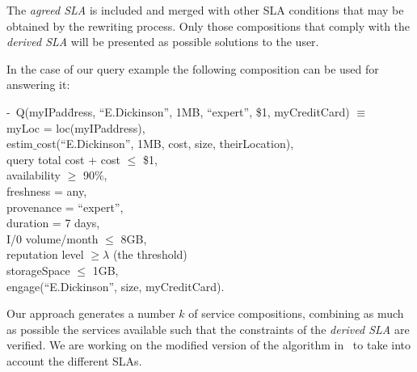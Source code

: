 The {\em agreed SLA} is included and merged with other SLA conditions that may be obtained by the rewriting process. Only those compositions that comply with the {\em derived SLA} will be presented as possible solutions to the user.
 

In the case of our query example the following composition can be used for answering it:

\begin{footnotesize}
\sf
\begin{tabbing}
 -~Q(myIPad\=dress, ``E.Dickinson'', 1MB, ``expert'', \$1, myCreditCard) $\equiv$ \\
 \>  myLoc = loc(myIPaddress), \\
 \>  estim$\_$cost(``E.Dickinson'', 1MB, cost, size, theirLocation), \\
 \>  query total cost + cost $\leq$ \$1,\\
 \>  availability $\geq$ 90$\%$, \\
 \>  freshness = any, \\
 \>  provenance = ``expert'', \\
 \>  duration = 7 days, \\
 \>  I/0 volume/month $\leq$ 8GB, \\
 \>  reputation level $\geq \lambda$ (the threshold) \\
 \>  storageSpace $\leq$ 1GB, \\
 \>  engage(``E.Dickinson'', size, myCreditCard).
 \end{tabbing} 
\end{footnotesize}

Our approach  generates a number $k$ of service compositions, combining as much as possible the services available such that the constraints of the {\em derived SLA} are verified. 
We are working on the modified version of the algorithm in~\cite{CostaAMR13} to take into account the different SLAs. 
 